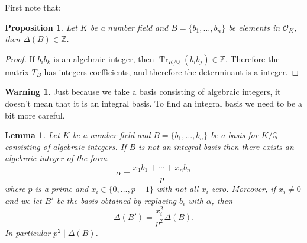 \documentclass[11pt,a4paper]{report}
\theoremstyle{plain}
\newtheorem{lemma}[subsection]{Lemma}
\newtheorem{prop}[subsection]{Proposition}
\theoremstyle{definition}
\theoremstyle{definition}
\newtheorem{warn}[subsection]{Warning}
\newcommand{\Tr}{\operatorname{Tr}}
\newcommand{\ZZ}{\mathbb{Z}}
\def\QQ{\mathbb{Q}}
\def \a{\alpha}
\def \OO {\mathcal{O}}
\begin{document}
	First note that:
	
	
	\begin{prop}\label{prop: int basis int disc}
		Let $K$ be a number field and $B=\{b_1,\dots,b_n\}$ be elements in $\OO_K$, then $\Delta(B) \in \ZZ$.
	\end{prop}
	
	
	\begin{proof}
		If $b_i b_k$ is an algebraic integer, then $\Tr_{K/\QQ}(b_i b_j) \in \ZZ$. Therefore the matrix $T_B$ has integers coefficients, and therefore the determinant is a integer.
	\end{proof}
	
	
	\begin{warn}
		Just because we take a basis consisting of algebraic integers, it doesn't mean that it is an integral basis. To find an integral basis we need to be a bit more careful.
	\end{warn}
	
	\begin{lemma}\label{lem: disc int basis}
		Let $K$ be a number field and $B=\{b_1,\dots,b_n\}$ be a basis for $K/\QQ$ consisting of algebraic integers. If $B$ is not an integral basis then there exists an algebraic integer of the form \[\a=\frac{x_1b_1+\cdots+x_nb_n}{p}\] where $p$ is a prime and $x_i \in \{0,\dots,p-1\}$ with not all $x_i$ zero. Moreover, if $x_i \neq 0$ and we let $B'$ be the basis obtained by replacing $b_i$ with $\a$, then \[\Delta(B')= \frac{x_i^2}{p^2} \Delta(B).\] In particular $p^2 \mid \Delta(B)$.
	\end{lemma} 
	
\end{document}
